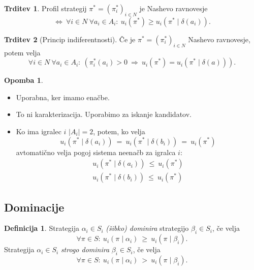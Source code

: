 \documentclass[11pt]{article}
\newcommand{\1}{\mathbbm{1}}
\theoremstyle{definition}
\newtheorem{definicija}{Definicija}[section]
\theoremstyle{definition}
\newtheorem{trditev}{Trditev}[section]
\theoremstyle{definition}
\theoremstyle{definition}
\newtheorem*{opomba}{Opomba}
\begin{document}
\begin{trditev}

Profil strategij $\pi^* = (\pi_i^*)_{i\in N}$ je Nashevo ravnovesje
$$\iff~ \forall i \in N ~\forall a_i \in A_i: ~u_i(\pi^*) \geq u_i(\pi^* \mid \delta(a_i)).$$

\end{trditev}
\vspace{0.5cm}

\begin{trditev}[Princip indiferentnosti]

Če je $\pi^* = (\pi_i^*)_{i \in N}$ Nashevo ravnovesje, potem velja
$$\forall i \in N ~\forall a_i \in A_i: ~(\pi_i^*(a_i) > 0 ~\Rightarrow~ u_i(\pi^*) = u_i(\pi^* \mid \delta(a))).$$

\end{trditev}
\vspace{0.5cm}

\begin{opomba}
~
\begin{itemize}
	\item Uporabna, ker imamo enačbe.
	\item To ni karakterizacija. Uporabimo za iskanje kandidatov.
	\item Ko ima igralec $i$ $|A_i| = 2$, potem, ko velja
	$$u_i(\pi^* \mid \delta(a_i)) ~=~ u_i(\pi^* \mid \delta(b_i)) ~=~ u_i(\pi^*)$$
	avtomatično velja pogoj sistema neenačb za igralca $i$:
	\begin{align*}
	u_i(\pi^* \mid \delta(a_i)) ~\leq~ u_i(\pi^*) \\
	u_i(\pi^* \mid \delta(b_i)) ~\leq~ u_i(\pi^*)
	\end{align*}
\end{itemize}

\end{opomba}
\vspace{0.5cm}


\subsection{Dominacije}
\vspace{0.5cm}

\begin{definicija}

Strategija $\alpha_i \in S_i$ \textit{(šibko) dominira} strategijo $\beta_i \in S_i$, če velja
$$\forall \pi \in S: ~u_i(\pi \mid \alpha_i) ~\geq~ u_i(\pi \mid \beta_i).$$
Strategija $\alpha_i \in S_i$ \textit{strogo dominira} $\beta_i \in S_i$, če velja
$$\forall \pi \in S: ~u_i(\pi \mid \alpha_i) ~>~ u_i(\pi \mid \beta_i).$$

\end{definicija}
\vspace{0.5cm}
\end{document}
